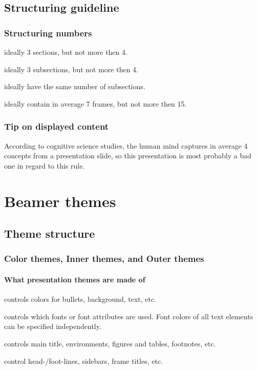 \documentclass{beamer}
\begin{document}
\subsection{Structuring guideline}

\begin{frame}
    \frametitle{Structuring numbers}
    \begin{description}
        \item<1-| alert@1>[presentation] ideally 3 sections, but not more then 4.
        \item<1-| alert@2>[sections] ideally 3 subsections, but not more then 4.
        \item<1-| alert@3>[sections] ideally have the same number of subsections.
        \item<1-| alert@4>[subsections] ideally contain in average 7 frames,
        but not more then 15.
    \end{description}
\end{frame}
\begin{frame}
    \frametitle{Tip on displayed content}

    According to cognitive science studies, the human mind captures in
    average 4 concepts from a presentation slide, so this presentation is most
    probably a bad one in regard to this rule.
\end{frame}

\section{Beamer themes}
\subsection{Theme structure}
\begin{frame}
    \frametitle{Color themes, Inner themes, and Outer themes}
    \framesubtitle{What presentation themes are made of}
    \begin{description}
        \item<1-| alert@1>[Color themes]
        controls colors for bullets, background, text, etc.
        \item<1-| alert@2>[Fonts themes]
        controls which fonts or font attributes are used. Font colors of all
        text elements can be specified independently.
        \item<1-| alert@3>[Inner themes]
        controls main title, environments, figures and tables, footnotes, etc.
        \item<1-| alert@4>[Outer themes]
        control head-/foot-lines, sidebars, frame titles, etc.
    \end{description}
\end{frame}
\end{document}
